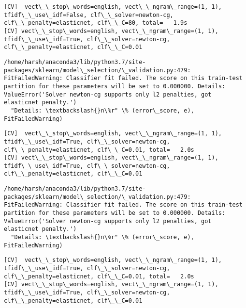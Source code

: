 \documentclass[11pt]{article}
\begin{document}
    \begin{Verbatim}[commandchars=\\\{\}]
[CV]  vect\_\_stop\_words=english, vect\_\_ngram\_range=(1, 1), tfidf\_\_use\_idf=False, clf\_\_solver=newton-cg, clf\_\_penalty=elasticnet, clf\_\_C=80, total=   1.9s
[CV] vect\_\_stop\_words=english, vect\_\_ngram\_range=(1, 1), tfidf\_\_use\_idf=True, clf\_\_solver=newton-cg, clf\_\_penalty=elasticnet, clf\_\_C=0.01 

    \end{Verbatim}

    \begin{Verbatim}[commandchars=\\\{\}]
/home/harsh/anaconda3/lib/python3.7/site-packages/sklearn/model\_selection/\_validation.py:479: FitFailedWarning: Classifier fit failed. The score on this train-test partition for these parameters will be set to 0.000000. Details: 
ValueError('Solver newton-cg supports only l2 penalties, got elasticnet penalty.')
  "Details: \textbackslash{}n\%r" \% (error\_score, e), FitFailedWarning)

    \end{Verbatim}

    \begin{Verbatim}[commandchars=\\\{\}]
[CV]  vect\_\_stop\_words=english, vect\_\_ngram\_range=(1, 1), tfidf\_\_use\_idf=True, clf\_\_solver=newton-cg, clf\_\_penalty=elasticnet, clf\_\_C=0.01, total=   2.0s
[CV] vect\_\_stop\_words=english, vect\_\_ngram\_range=(1, 1), tfidf\_\_use\_idf=True, clf\_\_solver=newton-cg, clf\_\_penalty=elasticnet, clf\_\_C=0.01 

    \end{Verbatim}

    \begin{Verbatim}[commandchars=\\\{\}]
/home/harsh/anaconda3/lib/python3.7/site-packages/sklearn/model\_selection/\_validation.py:479: FitFailedWarning: Classifier fit failed. The score on this train-test partition for these parameters will be set to 0.000000. Details: 
ValueError('Solver newton-cg supports only l2 penalties, got elasticnet penalty.')
  "Details: \textbackslash{}n\%r" \% (error\_score, e), FitFailedWarning)

    \end{Verbatim}

    \begin{Verbatim}[commandchars=\\\{\}]
[CV]  vect\_\_stop\_words=english, vect\_\_ngram\_range=(1, 1), tfidf\_\_use\_idf=True, clf\_\_solver=newton-cg, clf\_\_penalty=elasticnet, clf\_\_C=0.01, total=   2.0s
[CV] vect\_\_stop\_words=english, vect\_\_ngram\_range=(1, 1), tfidf\_\_use\_idf=True, clf\_\_solver=newton-cg, clf\_\_penalty=elasticnet, clf\_\_C=0.01 

    \end{Verbatim}
\end{document}
